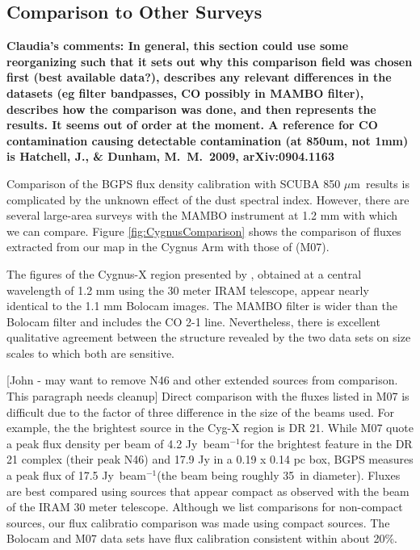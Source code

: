 \documentclass[12pt,preprint]{aastex}
\newcommand{\mum}{\ensuremath{\mu \mathrm{m}}}
\newcommand\jyb{Jy~beam$^{-1}$}
\begin{document}
\subsection{Comparison to Other Surveys}
\label{sec:motte}
\bf{Claudia's comments:}
In general, this section could use some reorganizing such that it sets out why
this comparison field was chosen first (best available data?), describes any
relevant differences in the datasets (eg filter bandpasses, CO possibly in
MAMBO filter), describes how the comparison was done, and then represents the
results.  It seems out of order at the moment.  A reference for CO
contamination causing detectable contamination (at 850um, not 1mm) is
Hatchell, J., \& Dunham, M.~M.\ 2009, arXiv:0904.1163 


Comparison of the BGPS flux density calibration
with SCUBA 850 \mum\ results is complicated by the unknown effect
of the dust spectral index.  However, there are several large-area
surveys with the MAMBO instrument at 1.2 mm with which we can compare.
Figure \ref{fig:CygnusComparison} shows the comparison of fluxes
extracted from our map in the Cygnus Arm with those of
\citet{motte07} (M07).

The figures of the Cygnus-X region presented by \citet{motte07}, obtained at a
central wavelength of 1.2 mm using the 30 meter IRAM telescope, appear nearly
identical to the 1.1 mm Bolocam images.  The MAMBO filter is wider than the
Bolocam filter and includes the CO 2-1 line.  Nevertheless, there is excellent
qualitative agreement between the structure revealed by the two data sets on size
scales to which both are sensitive. 

[John - may want to remove N46 and other extended sources from comparison.  This 
paragraph needs cleanup]
Direct comparison with the fluxes listed in M07 is difficult
due to the factor of three difference in the size of the beams used.  For
example, the the brightest source in the Cyg-X region is DR 21.  While M07
quote a peak flux density per beam of 4.2 \jyb for the brightest feature in
the DR 21 complex (their peak N46) and 17.9 Jy in a 0.19 x 0.14 pc box,
BGPS measures a peak flux of 17.5 \jyb (the beam being roughly 35\arcsec\ in
diameter).  Fluxes are best compared using sources that appear compact as
observed with the beam of the IRAM 30 meter telescope. Although we list comparisons
for non-compact sources, our flux calibratio comparison was made using compact sources.
The Bolocam and M07 data sets have flux calibration consistent within about
20\%.  
\end{document}
